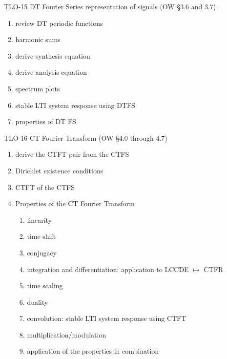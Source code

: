 \begin{enumerate}
\item[TLO-15] DT Fourier Series representation of signals  (OW \S 3.6 and 3.7)
  \begin{enumerate}
  \item review DT periodic functions
  \item harmonic sums
  \item derive synthesis equation
  \item derive analysis equation
  \item spectrum plots
  \item stable LTI system response using DTFS
  \item properties of DT FS
  \end{enumerate}
  
\item[TLO-16] CT Fourier Transform (OW \S 4.0 through 4.7)
  \begin{enumerate}
  \item derive the CTFT pair from the CTFS 
  \item Dirichlet existence conditions
  \item CTFT of the CTFS
  \item Properties of the CT Fourier Transform
    \begin{enumerate}
    \item linearity
    \item time shift
    \item conjugacy
    \item integration and differentiation: application to LCCDE $\mapsto$ CTFR
    \item time scaling
    \item duality
    \item convolution: stable LTI system response using CTFT
    \item multiplication/modulation
    \item application of the properties in combination
    \end{enumerate}
  \end{enumerate}


\end{enumerate}
